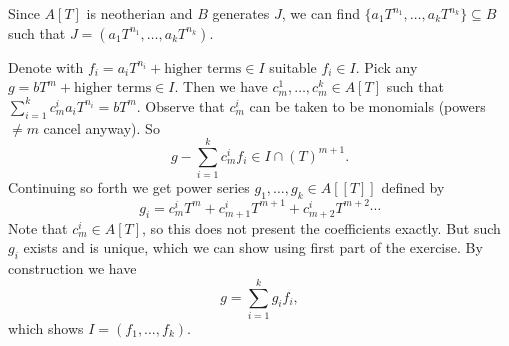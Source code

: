 \begin{exercise}{1}
\begin{enumerate}
            Since $A[T]$ is neotherian and $B$ generates $J$, we can find $\{
            a_1 T^{n_1}, \ldots, a_k T^{n_k} \} \subseteq B$ such that $J =
            (a_1 T^{n_1}, \ldots, a_k T^{n_k})$. 

            Denote with $f_i = a_i T^{n_i} + \text{higher terms} \in
            I$ suitable $f_i \in I$. Pick any $g = b T^m + \text{higher terms}
            \in I$. Then we have $c^1_m, \ldots, c^k_m \in A[T]$ such that
            $\sum^k_{i=1} c^i_m a_i T^{n_i} = b T^m$. Observe that $c^i_m$ can
            be taken to be monomials (powers $\not= m$ cancel anyway). So
            \begin{equation*}
                g - \sum^k_{i=1} c^i_m f_i \in I \cap {(T)}^{m+1}.
            \end{equation*}
            Continuing so forth we get power series $g_1, \ldots, g_k \in
            A[[T]]$ defined by
            \begin{equation*}
                g_i = c^i_m T^m + c^i_{m+1} T^{m+1} + c^i_{m+2} T^{m+2} \cdots
            \end{equation*}
            Note that $c^i_m \in A[T]$, so this does not present the
            coefficients exactly. But such $g_i$ exists and is unique, which we
            can show using first part of the exercise. By construction we have
            \begin{equation*}
                g = \sum^k_{i=1} g_i f_i,
            \end{equation*}
            which shows $I = (f_1, \ldots, f_k)$.
    \end{enumerate}
\end{exercise}

